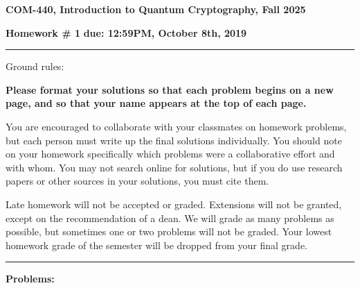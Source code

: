\documentclass[12pt]{article}
\newcommand{\header}[1]{\begin{center} {\large\bf #1} \end{center}}
\begin{document}
\header{COM-440, Introduction to Quantum Cryptography, Fall 2025}
{\bf Homework \# 1} \hfill {\bf due: 12:59PM, October 8th, 2019}


\medskip

\hrule

\medskip 

Ground rules: 

{\bf Please
  format your solutions so that each problem begins on a new page, and
  so that your name appears at the top of each page.}

You are encouraged to collaborate with your classmates on
homework problems, but each person must write up the final solutions
individually. You should note on your homework specifically which
problems were a collaborative effort and with whom. You may not search
online for solutions, but if you do use research papers or other
sources in your solutions, you must cite them.

Late homework will not be accepted or graded. Extensions will not be granted, except on the recommendation of a dean. We will grade as many problems as possible, but sometimes one or two problems will not be graded. Your lowest homework grade of the semester will be dropped from your final grade.


\medskip

\hrule

 
\medskip
{\bf Problems:}
\end{document}
